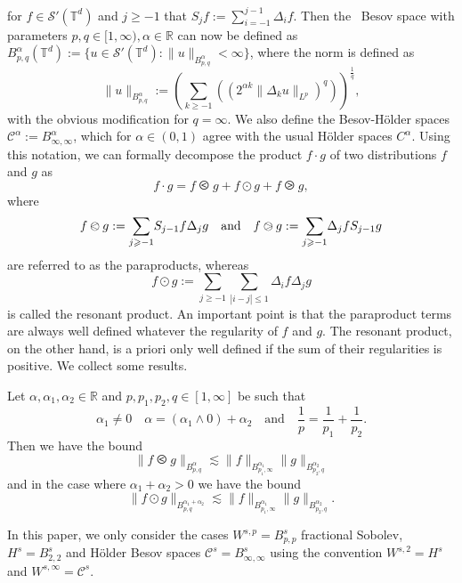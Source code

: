 for $f \in \mathcal{S}' (\mathbb{T}^d)$ and $j \geqslant - 1$ that $S_j f
:= \sum^{j - 1}_{i = - 1} \Delta_i f$. Then the \ Besov space with
parameters $p, q \in [1, \infty), \alpha \in \mathbb{R}$ can now be defined as
$B_{p, q}^{\alpha} (\mathbb{T}^d) := \{ u \in \mathcal{S}' (\mathbb{T}^d)
: \| u \|_{B_{p, q}^{\alpha}} < \infty \}$, where the norm is defined as
\[ \| u \|_{B_{p, q}^{\alpha}} := \left( \underset{k \geqslant - 1}{\sum}
   ((2^{\alpha k} \| \Delta_k u \|_{L^p})^q) \right)^{\frac{1}{q}}, \]
with the obvious modification for $q = \infty .$ We also define the
Besov-H{\"o}lder spaces $\mathcal{C}^{\alpha} := B_{\infty,
\infty}^{\alpha}$, which for $\alpha \in (0, 1)$ agree with the usual
H{\"o}lder spaces $C^{\alpha} .$ Using this notation, we can formally
decompose the product $f \cdot g$ of two distributions $f$ and $g$ as \
\[ f \cdot g = f \olessthan g + f \odot g + f \ogreaterthan g, \]
where
\[ f \olessthan g := \underset{j \geqslant - 1}{\sum} S_{j - 1} f
   \Delta_j g \quad \text{and\quad} f \ogreaterthan g := \underset{j
   \geqslant - 1}{\sum} \Delta_j f S_{j - 1} g \]
are referred to as the paraproducts, whereas
\[ f \odot g := \underset{j \geqslant - 1}{\sum} \underset{| i - j |
   \leqslant 1}{\sum} \Delta_i f \Delta_j g \]
is called the resonant product. An important point is that the
paraproduct terms are always well defined whatever the regularity of $f$ and
$g$. The resonant product, on the other hand, is a priori only well defined if
the sum of their regularities is positive. We collect some results.

\begin{lem}
  \label{lem:para}Let $\alpha, \alpha_1, \alpha_2 \in \mathbb{R}$ and $p, p_1,
  p_2, q \in [1, \infty]$ be such that
  \[ \alpha_1 \neq 0 \quad \alpha = (\alpha_1 \wedge 0) + \alpha_2 \quad
     \text{and} \quad \frac{1}{p} = \frac{1}{p_1} + \frac{1}{p_2} . \]
  Then we have the bound
  \[ \| f \olessthan g \|_{B_{p, q}^{\alpha}} \lesssim \| f \|_{B_{p_1,
     \infty}^{\alpha_1}} \| g \|_{{B^{\alpha_2}_{p_2, q}} } \]
  and in the case where $\alpha_1 + \alpha_2 > 0$ we have the bound
  \[ \| f \odot g \|_{B_{p, q}^{\alpha_1 + \alpha_2}} \lesssim \| f
     \|_{B_{p_1, \infty}^{\alpha_1}} \| g \|_{{B^{\alpha_2}_{p_2, q}} } . \]
\end{lem}

\begin{rem}
  In this paper, we only consider the cases $W^{s, p} {= B_{p, p}^s}
  $ fractional Sobolev, $H^s {= B_{2, 2}^s} $ and
 H{\"o}lder Besov spaces $\mathcal{C}^s = B_{\infty, \infty}^s$
  using the convention $W^{s, 2} = H^s$ and $W^{s, \infty} =\mathcal{C}^s$.
\end{rem}

